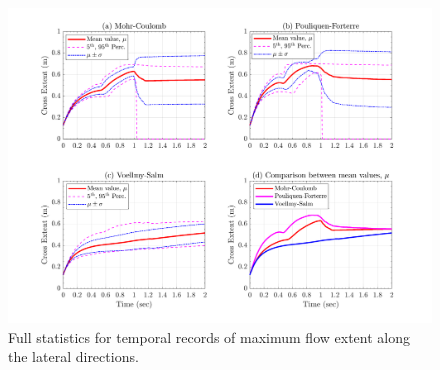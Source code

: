 \documentclass{article}
\begin{document}
%

\begin{figure}[H]
        \centering
        \includegraphics[width=1\textwidth]{InclinedPlane/GlobalRecords/crossEXTsStats.png}
        \caption{Full statistics for temporal records of maximum flow extent along the lateral directions.}
        \label{fig:Ramp-extLat}
\end{figure}
\end{document}
